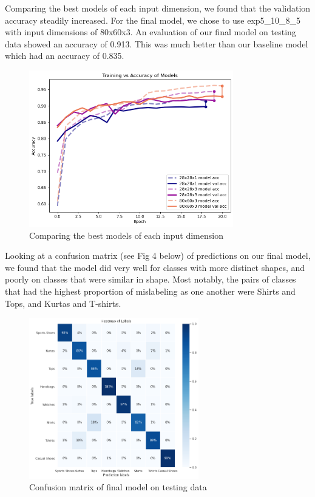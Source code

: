 \documentclass[twoside,twocolumn,9pt]{article}
\begin{document}
\noindent Comparing the best models of each input dimension, we found that the validation accuracy steadily increased. For the final model, we chose to use exp5\_10\_8\_5 with input dimensions of 80x60x3. An evaluation of our final model on testing data showed an accuracy of 0.913. This was much better than our baseline model which had an accuracy of 0.835. 

\begin{figure}[h]
\centering
  \includegraphics[height=6.8cm]{images/exp5}
  \caption{Comparing the best models of each input dimension}
  \label{fgr:example}
\end{figure}

\noindent Looking at a confusion matrix (see Fig 4 below) of predictions on our final model, we found that the model did very well for classes with more distinct shapes, and poorly on classes that were similar in shape. Most notably, the pairs of classes that had the highest proportion of mislabeling as one another were Shirts and Tops, and Kurtas and T-shirts.

\begin{figure}[h]
 \centering
 \includegraphics[height=7cm]{images/matrix}
 \caption{Confusion matrix of final model on testing data}
 \label{fgr:example2col}
\end{figure}
\end{document}
